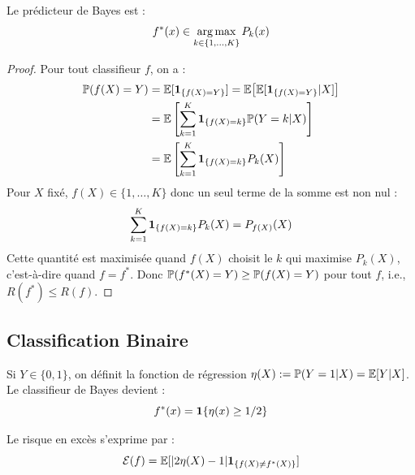 \begin{proposition}
Le prédicteur de Bayes est :
\begin{equation}
f^{*}(x)\in \operatorname*{arg\,max}_{k\in\{1,...,K\}}P_{k}(x)
\end{equation}
\end{proposition}

\begin{proof}
Pour tout classifieur $f$, on a :
\begin{align*}
\mathbb{P}(f(X) = Y) &= \mathbb{E}[\mathbf{1}_{\{f(X)=Y\}}] = \mathbb{E}\big[\mathbb{E}[\mathbf{1}_{\{f(X)=Y\}} | X]\big] \\
&= \mathbb{E}\left[\sum_{k=1}^K \mathbf{1}_{\{f(X)=k\}} \mathbb{P}(Y=k|X)\right] \\
&= \mathbb{E}\left[\sum_{k=1}^K \mathbf{1}_{\{f(X)=k\}} P_k(X)\right]
\end{align*}
Pour $X$ fixé, $f(X) \in \{1, \ldots, K\}$ donc un seul terme de la somme est non nul :
\[
\sum_{k=1}^K \mathbf{1}_{\{f(X)=k\}} P_k(X) = P_{f(X)}(X)
\]
Cette quantité est maximisée quand $f(X)$ choisit le $k$ qui maximise $P_k(X)$, c'est-à-dire quand $f = f^*$. Donc $\mathbb{P}(f^*(X) = Y) \ge \mathbb{P}(f(X) = Y)$ pour tout $f$, i.e., $R(f^*) \le R(f)$.
\end{proof}

\subsection{Classification Binaire}

Si $Y \in \{0,1\}$, on définit la fonction de régression $\eta(X) := \mathbb{P}(Y=1|X) = \mathbb{E}[Y|X]$. Le classifieur de Bayes devient :
\begin{equation}
f^{*}(x)=\mathbf{1}\{\eta(x)\ge 1/2\}
\end{equation}

\begin{proposition}
Le risque en excès s'exprime par :
\begin{equation}
\mathcal{E}(f)=\mathbb{E}[|2\eta(X)-1|\mathbf{1}_{\{f(X)\ne f^{*}(X)\}}]
\end{equation}
\end{proposition}

